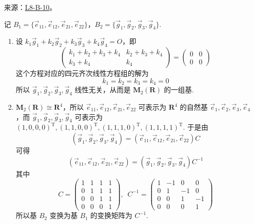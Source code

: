 \documentclass[12pt,fontset=fandol]{ctexart}
\begin{document}
\noindent 来源：\href{https://github.com/yhwu-is/Linear-Algebra-Left-Undone/blob/new/%E8%AE%B2%E4%B9%89/%E4%B8%93%E9%A2%98/8%20%E7%9B%B8%E6%8A%B5%E6%A0%87%E5%87%86%E5%BD%A2.tex}{L8-B-10}。
\begin{solve}
记 $ B_1 = \{\vec{e}_{11}, \vec{e}_{12}, \vec{e}_{21}, \vec{e}_{22}\} $，$ B_2 = \{\vec{g}_1, \vec{g}_2, \vec{g}_3, \vec{g}_4\} $.
            \begin{enumerate}
                \item 设 $ k_1 \vec{g}_1 + k_2 \vec{g}_2 + k_3 \vec{g}_3 + k_4 \vec{g}_4 = O $，即
                      \[ \begin{pmatrix} k_1 + k_2 + k_3 + k_4 & k_2 + k_3 + k_4 \\ k_3 + k_4 & k_4 \end{pmatrix} = \begin{pmatrix} 0 & 0 \\ 0 & 0 \end{pmatrix} \]
                      这个方程对应的四元齐次线性方程组的解为
                      \[ k_1 = k_2 = k_3 = k_4 = 0 \]
                      所以 $ \vec{g}_1, \vec{g}_2, \vec{g}_3, \vec{g}_4 $ 线性无关，从而是 $ \mathbf{M}_2(\mathbf{R}) $ 的一组基.

                \item \label{item:11:B:4:2}
                      $ \mathbf{M}_2(\mathbf{R}) \cong \mathbf{R}^4 $，所以 $ \vec{e}_{11}, \vec{e}_{12}, \vec{e}_{21}, \vec{e}_{22} $ 可表示为 $ \mathbf{R}^4 $ 的自然基 $ \vec{e}_1, \vec{e}_2, \vec{e}_3, \vec{e}_4 $，而 $ \vec{g}_1, \vec{g}_2, \vec{g}_3, \vec{g}_4 $ 可表示为 $ (1, 0, 0, 0)^{\mathrm{T}},\allowbreak (1, 1, 0, 0)^{\mathrm{T}},\allowbreak (1, 1, 1, 0)^{\mathrm{T}},\allowbreak (1, 1, 1, 1)^{\mathrm{T}} $. 于是由
                      \[ (\vec{g}_1, \vec{g}_2, \vec{g}_3, \vec{g}_4) = (\vec{e}_{11}, \vec{e}_{12}, \vec{e}_{21}, \vec{e}_{22}) C \]
                      可得
                      \[ (\vec{e}_{11}, \vec{e}_{12}, \vec{e}_{21}, \vec{e}_{22}) = (\vec{g}_1, \vec{g}_2, \vec{g}_3, \vec{g}_4) C^{-1} \]
                      其中
                      \[ C = \begin{pmatrix}
                              1 & 1 & 1 & 1 \\
                              0 & 1 & 1 & 1 \\
                              0 & 0 & 1 & 1 \\
                              0 & 0 & 0 & 1
                          \end{pmatrix},\enspace C^{-1} = \begin{pmatrix}
                              1 & -1 & 0  & 0  \\
                              0 & 1  & -1 & 0  \\
                              0 & 0  & 1  & -1 \\
                              0 & 0  & 0  & 1
                          \end{pmatrix} \]
                      所以基 $ B_2 $ 变换为基 $ B_1 $ 的变换矩阵为 $ C^{-1} $.


\end{enumerate}
\end{solve}
\end{document}

